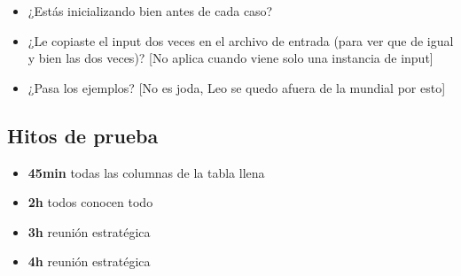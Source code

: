 \documentclass{article}
\begin{document}
\begin{multicols*}{2}
\begin{itemize}
\item ¿Estás inicializando bien antes de cada caso?
\item ¿Le copiaste el input dos veces en el archivo de entrada (para ver que de igual y bien las dos veces)? [No aplica cuando viene solo una instancia de input]
\item ¿Pasa los ejemplos? [No es joda, Leo se quedo afuera de la mundial por esto]
\end{itemize}
\subsection{Hitos de prueba}
\begin{itemize}
    \item \textbf{45min} todas las columnas de la tabla llena
    \item \textbf{2h} todos conocen todo
    \item \textbf{3h} reunión estratégica
    \item \textbf{4h} reunión estratégica   
\end{itemize}
\end{multicols*}
\end{document}

